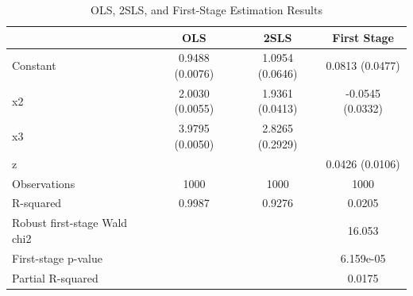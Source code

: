 \begin{table}
\caption{OLS, 2SLS, and First-Stage Estimation Results}
\label{tab:ols_iv_a1}
\begin{tabular}{lccc}
\toprule
 & OLS & 2SLS & First Stage \\
\midrule
Constant & 0.9488 (0.0076) & 1.0954 (0.0646) & 0.0813 (0.0477) \\
x2 & 2.0030 (0.0055) & 1.9361 (0.0413) & -0.0545 (0.0332) \\
x3 & 3.9795 (0.0050) & 2.8265 (0.2929) &  \\
z &  &  & 0.0426 (0.0106) \\
Observations & 1000 & 1000 & 1000 \\
R-squared & 0.9987 & 0.9276 & 0.0205 \\
Robust first-stage Wald chi2 &  &  & 16.053 \\
First-stage p-value &  &  & 6.159e-05 \\
Partial R-squared &  &  & 0.0175 \\
\bottomrule
\end{tabular}
\end{table}
